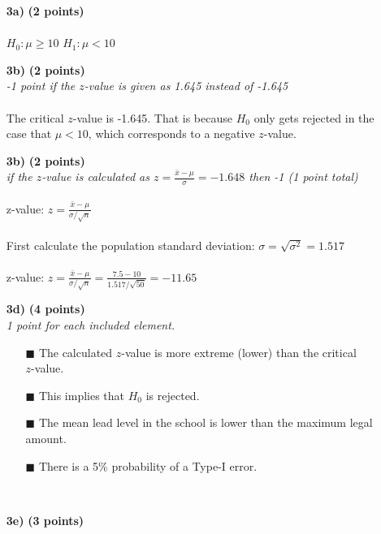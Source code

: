 \begin{itemize}
\item[\textbf{3a)}] \textbf{(2 points)} \\ \\
$H_0: \mu \geq 10$ \hspace{3cm} $H_1: \mu < 10$ \\
\item[\textbf{3b)}] \textbf{(2 points)} \\
\textit{-1 point if the $z$-value is given as 1.645 instead of -1.645} \\ \\
The critical $z$-value is -1.645. That is because $H_0$ only gets rejected in the case that $\mu < 10$, which corresponds to a negative $z$-value. \\
\item[\textbf{3b)}] \textbf{(2 points)} \\
\textit{if the $z$-value is calculated as $z = \frac{\bar{x} - \mu}{\sigma} = -1.648$ then -1 (1 point total)} \\ \\
z-value: $z = \frac{\bar{x} - \mu}{\sigma / \sqrt{n}}$ \\ \\
First calculate the population standard deviation: $\sigma = \sqrt{\sigma^2} = 1.517$ \\ \\
z-value: $z = \frac{\bar{x} - \mu}{\sigma / \sqrt{n}} = \frac{7.5 - 10}{1.517 / \sqrt{50}} = -11.65$ \\
\item[\textbf{3d)}] \textbf{(4 points)} \\
\textit{1 point for each included element.}
        \begin{itemize}
        \item[$\blacksquare$] The calculated $z$-value is more extreme (lower) than the critical \\$z$-value.
        \item[$\blacksquare$] This implies that $H_0$ is rejected.
        \item[$\blacksquare$] The mean lead level in the school is lower than the maximum legal amount.
        \item[$\blacksquare$] There is a 5\% probability of a Type-I error.
        \end{itemize} \\
\item[\textbf{3e)}] \textbf{(3 points)} \\

\end{itemize}
